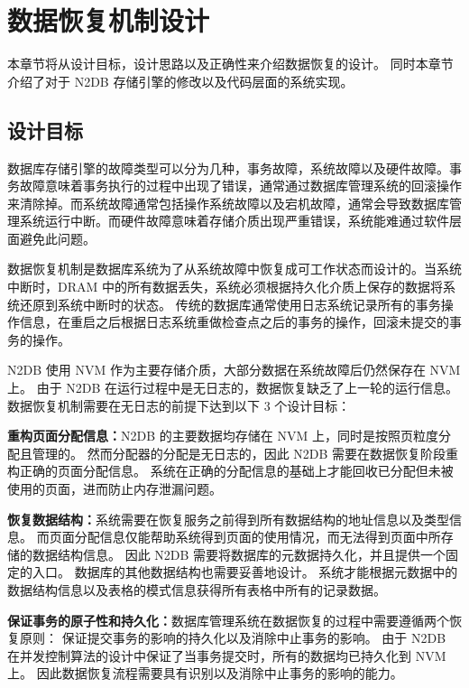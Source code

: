 
\chapter{数据恢复机制设计}
\label{chap:recovery}

本章节将从设计目标，设计思路以及正确性来介绍数据恢复的设计。
同时本章节介绍了对于 N2DB 存储引擎的修改以及代码层面的系统实现。

\section{设计目标}


数据库存储引擎的故障类型可以分为几种，事务故障，系统故障以及硬件故障。事务故障意味着事务执行的过程中出现了错误，通常通过数据库管理系统的回滚操作来清除掉。而系统故障通常包括操作系统故障以及宕机故障，通常会导致数据库管理系统运行中断。而硬件故障意味着存储介质出现严重错误，系统能难通过软件层面避免此问题。

数据恢复机制是数据库系统为了从系统故障中恢复成可工作状态而设计的。当系统中断时，DRAM 中的所有数据丢失，系统必须根据持久化介质上保存的数据将系统还原到系统中断时的状态。
传统的数据库通常使用日志系统记录所有的事务操作信息，在重启之后根据日志系统重做检查点之后的事务的操作，回滚未提交的事务的操作。

N2DB 使用 NVM 作为主要存储介质，大部分数据在系统故障后仍然保存在 NVM 上。
由于 N2DB 在运行过程中是无日志的，数据恢复缺乏了上一轮的运行信息。
数据恢复机制需要在无日志的前提下达到以下 3 个设计目标：

\textbf{重构页面分配信息：}N2DB 的主要数据均存储在 NVM 上，同时是按照页粒度分配且管理的。
然而分配器的分配是无日志的，因此 N2DB 需要在数据恢复阶段重构正确的页面分配信息。
系统在正确的分配信息的基础上才能回收已分配但未被使用的页面，进而防止内存泄漏问题。

\textbf{恢复数据结构：}系统需要在恢复服务之前得到所有数据结构的地址信息以及类型信息。
而页面分配信息仅能帮助系统得到页面的使用情况，而无法得到页面中所存储的数据结构信息。
因此 N2DB 需要将数据库的元数据持久化，并且提供一个固定的入口。
数据库的其他数据结构也需要妥善地设计。
系统才能根据元数据中的数据结构信息以及表格的模式信息获得所有表格中所有的记录数据。

\textbf{保证事务的原子性和持久化：}数据库管理系统在数据恢复的过程中需要遵循两个恢复原则：
保证提交事务的影响的持久化以及消除中止事务的影响。
由于 N2DB 在并发控制算法的设计中保证了当事务提交时，所有的数据均已持久化到 NVM 上。
因此数据恢复流程需要具有识别以及消除中止事务的影响的能力。

